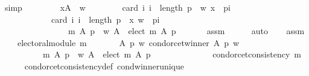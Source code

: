 \begin{isabellebody}
\ simp\isanewline
\ \ \isamarkupfalse%
\ \isamarkupfalse%
\isanewline
\ \ \ \ {\isachardoublequoteopen}{\isasymforall}x{\isasymin}A\ {\isacharminus}{\kern0pt}\ {\isacharbraceleft}{\kern0pt}w{\isacharbraceright}{\kern0pt}{\isachardot}{\kern0pt}\isanewline
\ \ \ \ \ \ \ \ card\ {\isacharbraceleft}{\kern0pt}i{\isachardot}{\kern0pt}\ i\ {\isacharless}{\kern0pt}\ length\ p\ {\isasymand}\ {\isacharparenleft}{\kern0pt}w{\isacharcomma}{\kern0pt}\ x{\isacharparenright}{\kern0pt}\ {\isasymin}\ {\isacharparenleft}{\kern0pt}p{\isacharbang}{\kern0pt}i{\isacharparenright}{\kern0pt}{\isacharbraceright}{\kern0pt}\ {\isacharless}{\kern0pt}\isanewline
\ \ \ \ \ \ \ \ \ \ \ \ card\ {\isacharbraceleft}{\kern0pt}i{\isachardot}{\kern0pt}\ i\ {\isacharless}{\kern0pt}\ length\ p\ {\isasymand}\ {\isacharparenleft}{\kern0pt}x{\isacharcomma}{\kern0pt}\ w{\isacharparenright}{\kern0pt}\ {\isasymin}\ {\isacharparenleft}{\kern0pt}p{\isacharbang}{\kern0pt}i{\isacharparenright}{\kern0pt}{\isacharbraceright}{\kern0pt}\ {\isasymLongrightarrow}\isanewline
\ \ \ \ \ \ \ \ \ \ \ \ \ \ \ \ m\ A\ p\ {\isacharequal}{\kern0pt}\ {\isacharparenleft}{\kern0pt}{\isacharbraceleft}{\kern0pt}w{\isacharbraceright}{\kern0pt}{\isacharcomma}{\kern0pt}\ A\ {\isacharminus}{\kern0pt}\ elect\ m\ A\ p{\isacharcomma}{\kern0pt}\ {\isacharbraceleft}{\kern0pt}{\isacharbraceright}{\kern0pt}{\isacharparenright}{\kern0pt}{\isachardoublequoteclose}\isanewline
\ \ \ \ \isamarkupfalse%
\ assm{}\isanewline
\ \ \ \ \isamarkupfalse%
\ auto\isanewline
{}\isamarkupfalse%
\isanewline
\ \ \isamarkupfalse%
\ assm{}{\isacharcolon}{\kern0pt}\isanewline
\ \ \ \ {\isachardoublequoteopen}electoral{\isacharunderscore}{\kern0pt}module\ m\ {\isasymLongrightarrow}\isanewline
\ \ \ \ \ \ {\isasymforall}A\ p\ w{\isachardot}{\kern0pt}\ condorcet{\isacharunderscore}{\kern0pt}winner\ A\ p\ w\ {\isasymlongrightarrow}\isanewline
\ \ \ \ \ \ \ \ \ \ m\ A\ p\ {\isacharequal}{\kern0pt}\ {\isacharparenleft}{\kern0pt}{\isacharbraceleft}{\kern0pt}w{\isacharbraceright}{\kern0pt}{\isacharcomma}{\kern0pt}\ A\ {\isacharminus}{\kern0pt}\ elect\ m\ A\ p{\isacharcomma}{\kern0pt}\ {\isacharbraceleft}{\kern0pt}{\isacharbraceright}{\kern0pt}{\isacharparenright}{\kern0pt}\ {\isasymLongrightarrow}\isanewline
\ \ \ \ \ \ \ \ \ \ \ \ condorcet{\isacharunderscore}{\kern0pt}consistency\ m{\isachardoublequoteclose}\isanewline
\ \ \ \ \isamarkupfalse%
\ condorcet{\isacharunderscore}{\kern0pt}consistency{\isacharunderscore}{\kern0pt}def\ cond{\isacharunderscore}{\kern0pt}winner{\isacharunderscore}{\kern0pt}unique{}\isanewline

\end{isabellebody}
